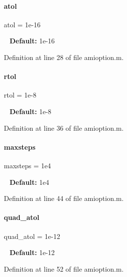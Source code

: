 \paragraph{\texorpdfstring{atol}{atol}}
{\footnotesize\ttfamily atol = 1e-\/16}

~\newline
{\bfseries Default\+:} 1e-\/16 

Definition at line 28 of file amioption.\+m.

\mbox{\label{classamioption_a7978e9a4674f869e6b2950e2f6262ca5}} 
\paragraph{\texorpdfstring{rtol}{rtol}}
{\footnotesize\ttfamily rtol = 1e-\/8}

~\newline
{\bfseries Default\+:} 1e-\/8 

Definition at line 36 of file amioption.\+m.

\mbox{\label{classamioption_ac37622882dacee1f11688d4941ccb45e}} 
\paragraph{\texorpdfstring{maxsteps}{maxsteps}}
{\footnotesize\ttfamily maxsteps = 1e4}

~\newline
{\bfseries Default\+:} 1e4 

Definition at line 44 of file amioption.\+m.

\mbox{\label{classamioption_ad77eb68a40bc4659c33df68b373f3fd7}} 
\paragraph{\texorpdfstring{quad\+\_\+atol}{quad\_atol}}
{\footnotesize\ttfamily quad\+\_\+atol = 1e-\/12}

~\newline
{\bfseries Default\+:} 1e-\/12 

Definition at line 52 of file amioption.\+m.

